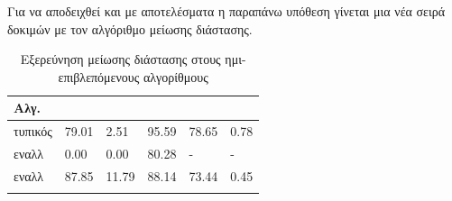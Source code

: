 Για να αποδειχθεί και με αποτελέσματα η παραπάνω υπόθεση γίνεται μια νέα σειρά δοκιμών με τον αλγόριθμο μείωσης διάστασης.
\begin{center}
\begin{longtabu} to 0.8\textwidth { | X[c] || X[c] | X[c] | X[c] | X[c] | X[c] |  }
 \hline
 Αλγ.&   &  &  &  & \\
\hline
 τυπικός & 79.01 & 2.51 & 95.59 & 78.65 & 0.78\\
 \hline
 εναλλ& 0.00 & 0.00  & 80.28 &  - &  -\\ 
\hline
 εναλλ& 87.85 & 11.79  & 88.14 & 73.44 & 0.45\\ 
 \hline
\caption{Εξερεύνηση μείωσης διάστασης στους ημι-επιβλεπόμενους αλγορίθμους}
\label{tab:testpcasemisup}
\end{longtabu}
\end{center}
